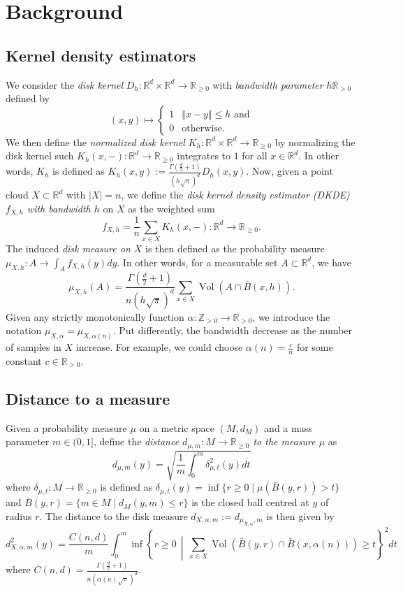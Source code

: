 \documentclass[10pt,a4paper]{article}
\theoremstyle{definition}
\newcommand{\R}{\mathbb{R}}
\begin{document}
	\section{Background}
	\subsection{Kernel density estimators}
	We consider the \textit{disk kernel} $D_h\colon\R^d\times\R^d\to\R_{\geq0}$ with \textit{bandwidth parameter} $h\R_{>0}$ defined by
	$$
	(x,y)\mapsto 
	\begin{cases} 
		1 & \Vert x - y\Vert \leq h\text{ and} \\
		0 & \text{otherwise.}
	\end{cases}
	$$
	We then define the \textit{normalized disk kernel} $K_h\colon\R^d\times\R^d\to\R_{\geq0}$ by normalizing the disk kernel such $K_h(x,-)\colon\R^d\to\R_{\geq0}$ integrates to $1$ for all $x\in\R^d$. In other words, $K_h$ is defined as $K_h(x,y):=\frac{\Gamma(\frac{d}{2}+1)}{(h\sqrt{\pi})^d}D_h(x,y)$. Now, given a point cloud $X\subset\R^d$ with $|X|=n$, we define the \textit{disk kernel density estimator (DKDE) $f_{X,h}$ with bandwidth $h$} on $X$ as the weighted sum
	$$
	f_{X,h} = \frac{1}{n}\sum_{x\in X}K_h(x,-)\colon\R^d\to\R_{\geq0}.
	$$
	The induced \textit{disk measure on $X$} is then defined as the probability measure $\mu_{X,h}\colon A\to\int_A f_{X,h}(y)dy$. In other words, for a measurable set $A\subset\R^d$, we have
	$$
	\mu_{X,h}(A) = \frac{\Gamma(\frac{d}{2}+1)}{n(h\sqrt{\pi})^d}\sum_{x\in X}\operatorname{Vol}(A\cap\bar{B}(x,h)).
	$$
	Given any strictly monotonically function $\alpha\colon\mathbb{Z}_{>0}\to\R_{>0}$, we introduce the notation $\mu_{X,\alpha} = \mu_{X,\alpha(n)}$. Put differently, the bandwidth decrease as the number of samples in $X$ increase. For example, we could choose $\alpha(n)=\frac{c}{n}$ for some constant $c\in\R_{>0}$.
	
	\subsection{Distance to a measure}
	Given a probability measure $\mu$ on a metric space $(M,d_M)$ and a mass parameter $m\in(0,1]$, define the \textit{distance $d_{\mu,m}\colon M\to\R_{\geq0}$ to the measure $\mu$} as
	$$
	d_{\mu,m}(y) = \sqrt{\frac{1}{m}\int_0^m\delta_{\mu, t}^2(y)dt}
	$$
	where $\delta_{\mu,t}\colon M\to\R_{\geq0}$ is defined as $\delta_{\mu,t}(y)=\inf\{r\geq0\mid\mu(\bar{B}(y,r))>t\}$ and $\bar{B}(y,r)=\{m\in M\mid d_M(y,m)\leq r\}$ is the closed ball centred at $y$ of radius $r$. The distance to the disk measure $d_{X,\alpha, m} := d_{\mu_{X,\alpha}, m}$ is then given by
	$$
	d_{X,\alpha, m}^2(y) = \frac{C(n,d)}{m}\int_0^m\inf\left\{r\geq 0\,\middle\vert\,\sum_{x\in X}\operatorname{Vol}(\bar{B}(y,r)\cap\bar{B}(x,\alpha(n)))\geq t\right\}^2 dt
	$$
	where $C(n,d)=\frac{\Gamma(\frac{d}{2}+1)}{n(\alpha(n)\sqrt{\pi})^d}$.
	
	\printbibliography
	
\end{document}
